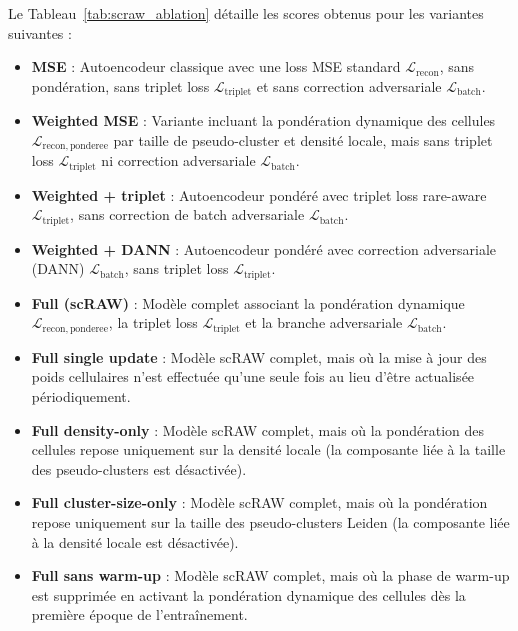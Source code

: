 Le Tableau~\ref{tab:scraw_ablation} détaille les scores obtenus pour les variantes suivantes :
\begin{itemize}
    \item \textbf{MSE} : Autoencodeur classique avec une loss MSE standard \(\mathcal{L}_{\mathrm{recon}}\), sans pondération, sans triplet loss \(\mathcal{L}_{\mathrm{triplet}}\) et sans correction adversariale \(\mathcal{L}_{\mathrm{batch}}\).
    \item \textbf{Weighted MSE} : Variante incluant la pondération dynamique des cellules \(\mathcal{L}_{\mathrm{recon,ponderee}}\) par taille de pseudo-cluster et densité locale, mais sans triplet loss \(\mathcal{L}_{\mathrm{triplet}}\) ni correction adversariale \(\mathcal{L}_{\mathrm{batch}}\).
    \item \textbf{Weighted + triplet} : Autoencodeur pondéré avec triplet loss rare-aware \(\mathcal{L}_{\mathrm{triplet}}\), sans correction de batch adversariale \(\mathcal{L}_{\mathrm{batch}}\).
    \item \textbf{Weighted + DANN} : Autoencodeur pondéré avec correction adversariale (DANN) \(\mathcal{L}_{\mathrm{batch}}\), sans triplet loss \(\mathcal{L}_{\mathrm{triplet}}\).
    \item \textbf{Full (scRAW)} : Modèle complet associant la pondération dynamique \(\mathcal{L}_{\mathrm{recon,ponderee}}\), la triplet loss \(\mathcal{L}_{\mathrm{triplet}}\) et la branche adversariale \(\mathcal{L}_{\mathrm{batch}}\).
    \item \textbf{Full single update} : Modèle scRAW complet, mais où la mise à jour des poids cellulaires n'est effectuée qu'une seule fois au lieu d'être actualisée périodiquement.
    \item \textbf{Full density-only} : Modèle scRAW complet, mais où la pondération des cellules repose uniquement sur la densité locale (la composante liée à la taille des pseudo-clusters est désactivée).
    \item \textbf{Full cluster-size-only} : Modèle scRAW complet, mais où la pondération repose uniquement sur la taille des pseudo-clusters Leiden (la composante liée à la densité locale est désactivée).
    \item \textbf{Full sans warm-up} : Modèle scRAW complet, mais où la phase de warm-up est supprimée en activant la pondération dynamique des cellules dès la première époque de l'entraînement.
\end{itemize}

